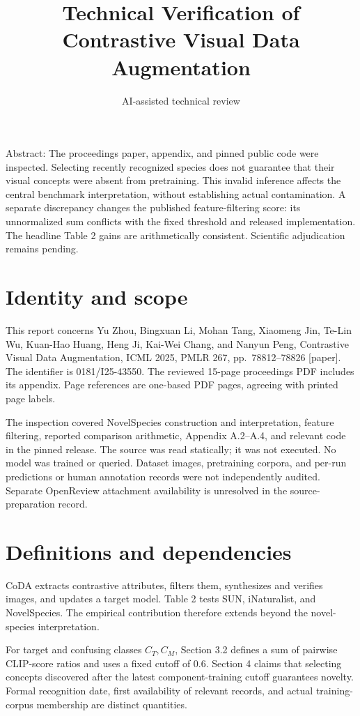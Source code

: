 \documentclass[10pt]{article}
\title{Technical Verification of Contrastive Visual Data Augmentation}
\author{AI-assisted technical review}
\date{}
\begin{document}
\maketitle
Abstract: The proceedings paper, appendix, and pinned public code were inspected. Selecting recently recognized species does not guarantee that their visual concepts were absent from pretraining. This invalid inference affects the central benchmark interpretation, without establishing actual contamination. A separate discrepancy changes the published feature-filtering score: its unnormalized sum conflicts with the fixed threshold and released implementation. The headline Table 2 gains are arithmetically consistent. Scientific adjudication remains pending.\par
\section*{Identity and scope}
This report concerns Yu Zhou, Bingxuan Li, Mohan Tang, Xiaomeng Jin, Te-Lin Wu, Kuan-Hao Huang, Heng Ji, Kai-Wei Chang, and Nanyun Peng, Contrastive Visual Data Augmentation, ICML 2025, PMLR 267, pp. 78812–78826 [paper]. The identifier is 0181/I25-43550. The reviewed 15-page proceedings PDF includes its appendix. Page references are one-based PDF pages, agreeing with printed page labels.\par
The inspection covered NovelSpecies construction and interpretation, feature filtering, reported comparison arithmetic, Appendix A.2–A.4, and relevant code in the pinned release. The source was read statically; it was not executed. No model was trained or queried. Dataset images, pretraining corpora, and per-run predictions or human annotation records were not independently audited. Separate OpenReview attachment availability is unresolved in the source-preparation record.\par
\section*{Definitions and dependencies}
CoDA extracts contrastive attributes, filters them, synthesizes and verifies images, and updates a target model. Table 2 tests SUN, iNaturalist, and NovelSpecies. The empirical contribution therefore extends beyond the novel-species interpretation.\par
For target and confusing classes \(C_T,C_M\), Section 3.2 defines a sum of pairwise CLIP-score ratios and uses a fixed cutoff of \(0.6\). Section 4 claims that selecting concepts discovered after the latest component-training cutoff guarantees novelty. Formal recognition date, first availability of relevant records, and actual training-corpus membership are distinct quantities.\par
\end{document}
